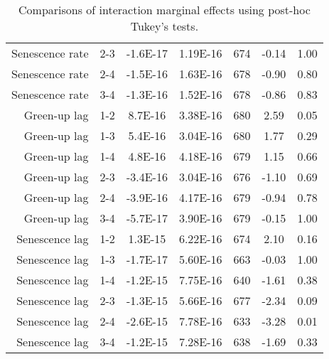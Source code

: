 \begin{table}[H]
\begin{tabular}{rcccccc}
  Senescence rate & 2-3 & -1.6E-17 & 1.19E-16 & 674 & -0.14 & 1.00 \\ 
  Senescence rate & 2-4 & -1.5E-16 & 1.63E-16 & 678 & -0.90 & 0.80 \\ 
  Senescence rate & 3-4 & -1.3E-16 & 1.52E-16 & 678 & -0.86 & 0.83 \\ 
   \hline
Green-up lag & 1-2 & 8.7E-16 & 3.38E-16 & 680 & 2.59 & 0.05 \\ 
  Green-up lag & 1-3 & 5.4E-16 & 3.04E-16 & 680 & 1.77 & 0.29 \\ 
  Green-up lag & 1-4 & 4.8E-16 & 4.18E-16 & 679 & 1.15 & 0.66 \\ 
  Green-up lag & 2-3 & -3.4E-16 & 3.04E-16 & 676 & -1.10 & 0.69 \\ 
  Green-up lag & 2-4 & -3.9E-16 & 4.17E-16 & 679 & -0.94 & 0.78 \\ 
  Green-up lag & 3-4 & -5.7E-17 & 3.90E-16 & 679 & -0.15 & 1.00 \\ 
   \hline
Senescence lag & 1-2 & 1.3E-15 & 6.22E-16 & 674 & 2.10 & 0.16 \\ 
  Senescence lag & 1-3 & -1.7E-17 & 5.60E-16 & 663 & -0.03 & 1.00 \\ 
  Senescence lag & 1-4 & -1.2E-15 & 7.75E-16 & 640 & -1.61 & 0.38 \\ 
  Senescence lag & 2-3 & -1.3E-15 & 5.66E-16 & 677 & -2.34 & 0.09 \\ 
  Senescence lag & 2-4 & -2.6E-15 & 7.78E-16 & 633 & -3.28 & 0.01 \\ 
  Senescence lag & 3-4 & -1.2E-15 & 7.28E-16 & 638 & -1.69 & 0.33 \\ 
   \hline
\end{tabular}
\caption{Comparisons of interaction marginal effects using post-hoc Tukey's tests.} 
\label{lsq_terms}
\end{table}

